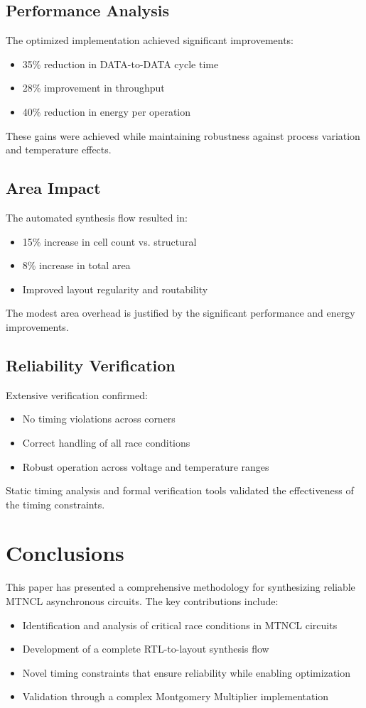 \documentclass[conference]{IEEEtran}
\begin{document}
\subsection{Performance Analysis}
The optimized implementation achieved significant improvements:
\begin{itemize}
\item 35\% reduction in DATA-to-DATA cycle time
\item 28\% improvement in throughput
\item 40\% reduction in energy per operation
\end{itemize}
These gains were achieved while maintaining robustness against process variation and temperature effects.

\subsection{Area Impact}
The automated synthesis flow resulted in:
\begin{itemize}
\item 15\% increase in cell count vs. structural
\item 8\% increase in total area
\item Improved layout regularity and routability
\end{itemize}
The modest area overhead is justified by the significant performance and energy improvements.

\subsection{Reliability Verification}
Extensive verification confirmed:
\begin{itemize}
\item No timing violations across corners
\item Correct handling of all race conditions
\item Robust operation across voltage and temperature ranges
\end{itemize}
Static timing analysis and formal verification tools validated the effectiveness of the timing constraints.

\section{Conclusions}
This paper has presented a comprehensive methodology for synthesizing reliable MTNCL asynchronous circuits. The key contributions include:
\begin{itemize}
\item Identification and analysis of critical race conditions in MTNCL circuits
\item Development of a complete RTL-to-layout synthesis flow
\item Novel timing constraints that ensure reliability while enabling optimization
\item Validation through a complex Montgomery Multiplier implementation
\end{itemize}
\end{document}
